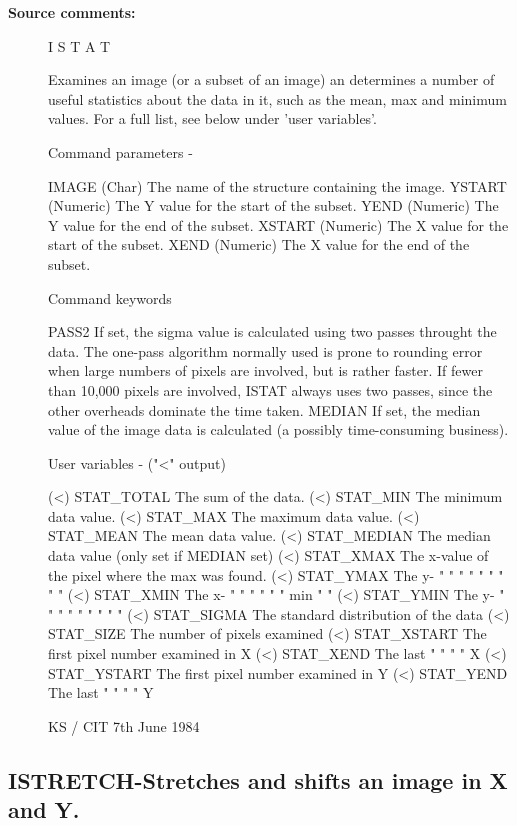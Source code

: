 \begin{description}
\begin{description}
\item [\textbf{Source comments:}]
\begin{terminalv}
 I S T A T

 Examines an image (or a subset of an image) an determines
 a number of useful statistics about the data in it, such as
 the mean, max and minimum values.  For a full list, see below
 under 'user variables'.

 Command parameters -

 IMAGE  (Char) The name of the structure containing the image.
 YSTART (Numeric) The Y value for the start of the subset.
 YEND   (Numeric) The Y value for the end of the subset.
 XSTART (Numeric) The X value for the start of the subset.
 XEND   (Numeric) The X value for the end of the subset.

 Command keywords

 PASS2   If set, the sigma value is calculated using two
         passes throught the data.  The one-pass algorithm normally
         used is prone to rounding error when large numbers of
         pixels are involved, but is rather faster.  If fewer than
         10,000 pixels are involved, ISTAT always uses two passes,
         since the other overheads dominate the time taken.
 MEDIAN  If set, the median value of the image data is
         calculated (a possibly time-consuming business).

 User variables -   ("<" output)

 (<) STAT_TOTAL   The sum of the data.
 (<) STAT_MIN     The minimum data value.
 (<) STAT_MAX     The maximum data value.
 (<) STAT_MEAN    The mean data value.
 (<) STAT_MEDIAN  The median data value (only set if MEDIAN set)
 (<) STAT_XMAX    The x-value of the pixel where the max was found.
 (<) STAT_YMAX    The y-  "   "   "    "     "     "   "   "    "
 (<) STAT_XMIN    The x-  "   "   "    "     "     " min   "    "
 (<) STAT_YMIN    The y-  "   "   "    "     "     "   "   "    "
 (<) STAT_SIGMA   The standard distribution of the data
 (<) STAT_SIZE    The number of pixels examined
 (<) STAT_XSTART  The first pixel number examined in X
 (<) STAT_XEND    The last    "     "        "     " X
 (<) STAT_YSTART  The first pixel number examined in Y
 (<) STAT_YEND    The last    "     "        "     " Y

                                  KS / CIT 7th June 1984
\end{terminalv}
\end{description}
\subsection{ISTRETCH-\label{ISTRETCH}Stretches and shifts an image in X and Y.}
\begin{description}


\end{description}
\end{description}
